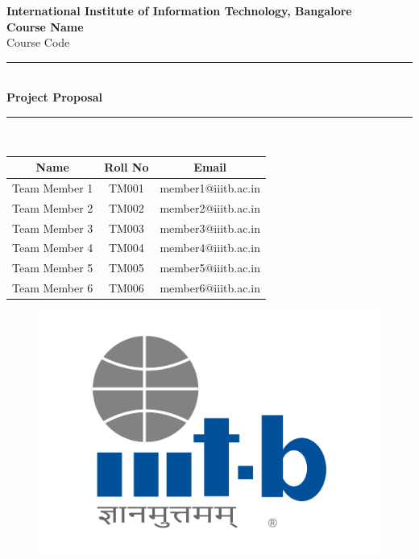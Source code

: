\documentclass[a4paper,12pt]{article}
\begin{document}
\begin{center}
    \LARGE \textbf{International Institute of Information Technology, Bangalore}\\
    \vspace{1cm}
    {\LARGE \textbf{Course Name}}\\
    \large{Course Code}\\
    \vspace{2cm}
    \rule{\linewidth}{0.5mm} \\[10pt]
    {\Huge \textbf{Project Proposal}}\\[10pt]
    \rule{\linewidth}{0.5mm} \\[20pt]
\end{center}

\vspace{1.5cm}

\begin{center}
    \vspace{10pt}
    
    \renewcommand{\arraystretch}{1.2}
    \begin{tabular}{|c|c|c|}
        \hline
        \textbf{Name} & \textbf{Roll No} & \textbf{Email} \\
        \hline
        Team Member 1 & TM001 & member1@iiitb.ac.in \\
        Team Member 2 & TM002 & member2@iiitb.ac.in \\
        Team Member 3 & TM003 & member3@iiitb.ac.in \\
        Team Member 4 & TM004 & member4@iiitb.ac.in \\
        Team Member 5 & TM005 & member5@iiitb.ac.in \\
        Team Member 6 & TM006 & member6@iiitb.ac.in \\
        \hline
    \end{tabular}
\end{center}


\vfill
\begin{figure}  
    \centering
    \includegraphics[width=0.5\linewidth]{iiitb_logo.png}
\end{figure}
\end{document}
